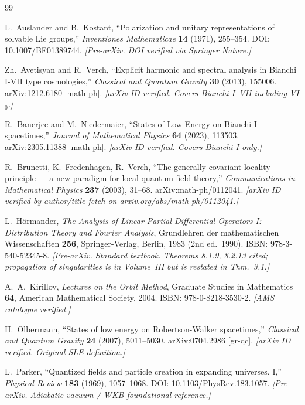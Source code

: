 \documentclass[11pt,a4paper]{article}
\theoremstyle{definition}
\begin{document}
\begin{thebibliography}{99}

  L.~Auslander and B.~Kostant,
  ``Polarization and unitary representations of solvable Lie groups,''
  \emph{Inventiones Mathematicae} \textbf{14} (1971), 255--354.
  DOI: 10.1007/BF01389744.
  \textit{[Pre-arXiv. DOI verified via Springer Nature.]}

  Zh.~Avetisyan and R.~Verch,
  ``Explicit harmonic and spectral analysis in Bianchi I-VII type cosmologies,''
  \emph{Classical and Quantum Gravity} \textbf{30} (2013), 155006.
  arXiv:1212.6180 [math-ph].
  \textit{[arXiv ID verified.  Covers Bianchi I--VII including VI$_0$.]}

  R.~Banerjee and M.~Niedermaier,
  ``States of Low Energy on Bianchi I spacetimes,''
  \emph{Journal of Mathematical Physics} \textbf{64} (2023), 113503.
  arXiv:2305.11388 [math-ph].
  \textit{[arXiv ID verified.  Covers Bianchi I only.]}

  R.~Brunetti, K.~Fredenhagen, R.~Verch,
  ``The generally covariant locality principle --- a new paradigm for local
   quantum field theory,''
  \emph{Communications in Mathematical Physics} \textbf{237} (2003), 31--68.
  arXiv:math-ph/0112041.
  \textit{[arXiv ID verified by author/title fetch on arxiv.org/abs/math-ph/0112041.]}

  L.~H\"ormander,
  \emph{The Analysis of Linear Partial Differential Operators I:
   Distribution Theory and Fourier Analysis},
  Grundlehren der mathematischen Wissenschaften \textbf{256},
  Springer-Verlag, Berlin, 1983 (2nd ed.\ 1990).
  ISBN: 978-3-540-52345-8.
  \textit{[Pre-arXiv. Standard textbook.  Theorems 8.1.9, 8.2.13 cited;
   propagation of singularities is in Volume~III but is restated in
   \cite{Rad96} Thm.~3.1.]}

  A.~A.~Kirillov,
  \emph{Lectures on the Orbit Method},
  Graduate Studies in Mathematics \textbf{64},
  American Mathematical Society, 2004.
  ISBN: 978-0-8218-3530-2.
  \textit{[AMS catalogue verified.]}

  H.~Olbermann,
  ``States of low energy on Robertson-Walker spacetimes,''
  \emph{Classical and Quantum Gravity} \textbf{24} (2007), 5011--5030.
  arXiv:0704.2986 [gr-qc].
  \textit{[arXiv ID verified. Original SLE definition.]}

  L.~Parker,
  ``Quantized fields and particle creation in expanding universes. I,''
  \emph{Physical Review} \textbf{183} (1969), 1057--1068.
  DOI: 10.1103/PhysRev.183.1057.
  \textit{[Pre-arXiv. Adiabatic vacuum / WKB foundational reference.]}


\end{thebibliography}
\end{document}
